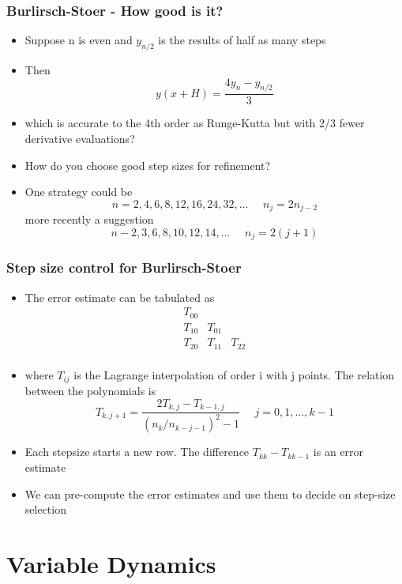 \documentclass[10pt]{beamer}
\begin{document}
\begin{frame}
  \frametitle{Burlirsch-Stoer - How good is it? }
  \begin{itemize}
  \item Suppose n is even and $y_{n/2}$ is the results of half as many steps    
  \item Then
    \[
      y(x+H) = \frac{4 y_n - y_{n/2}}{3}
    \]
  \item which is accurate to the 4th order as Runge-Kutta but with
    2/3 fewer derivative evaluations? 
  \item How do you choose good step sizes for refinement? \pause
  \item One strategy could be
    \[
      n = 2, 4, 6, 8, 12, 16, 24, 32, \ldots \mbox{~~~~} n_j = 2 n_{j-2}
    \]
    more recently a suggestion
    \[
      n - 2, 3, 6, 8, 10, 12, 14, \ldots \mbox{~~~~} n_j = 2(j+1)
    \]
  \end{itemize}  
\end{frame}

\begin{frame}
  \frametitle{Step size control for Burlirsch-Stoer}
  \begin{itemize}
  \item The error estimate can be tabulated as
    \[
      \begin{array}{lll}
        T_{00} && \\
        T_{10} & T_{01} & \\
        T_{20} & T_{11} & T_{22} \\
      \end{array}
    \]
  \item where $T_{ij}$ is the Lagrange interpolation of order i with j points. The relation between the polynomials is
    \[
      T_{k, j+1} = \frac{2 T_{k,j} - T_{k-1,j}}{(n_k / n_{k-j-1})^2 - 1} \mbox{~~~~} j = 0, 1, \ldots, k-1
    \]
  \item Each stepsize starts a new row. The difference
    $T_{kk} - T_{kk-1}$ is  an error estimate
  \item We can pre-compute the error estimates and use them to decide
    on step-size selection
  \end{itemize}
\end{frame}


\section{Variable Dynamics}
\end{document}
